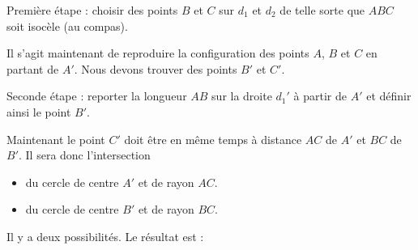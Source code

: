 Première étape : choisir des points \( B\) et \( C\) sur \( d_1\) et \( d_2\) de telle sorte que \( ABC\) soit isocèle (au compas).

\begin{center}
   
\end{center}

Il s'agit maintenant de reproduire la configuration des points \( A\), \( B\) et \( C\) en partant de \( A'\). Nous devons trouver des points \( B'\) et \( C'\).

Seconde étape : reporter la longueur \( AB\) sur la droite \( d_1'\) à partir de \( A'\) et définir ainsi le point \( B'\).

\begin{center}
   
\end{center}

Maintenant le point \( C'\) doit être en même temps à distance \( AC\) de \( A'\) et \( BC\) de \( B'\). Il sera donc l'intersection
\begin{itemize}
    \item 
        du cercle de centre \( A'\) et de rayon \( AC\).
    \item
        du cercle de centre \( B'\) et de rayon \( BC\).
\end{itemize}

\begin{center}
   
\end{center}

Il y a deux possibilités. Le résultat est :
\begin{center}
   
\end{center}


